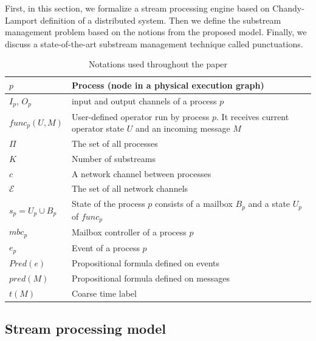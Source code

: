 \label{fs-acker-preliminaries}

First, in this section, we formalize a stream processing engine based on Chandy-Lamport definition of a distributed system. Then we define the substream management problem based on the notions from the proposed model. Finally, we discuss a state-of-the-art substream management technique called punctuations.

\begin{table}[!b]
    \caption{Notations used throughout the paper}
    \footnotesize
    \begin{tabular}{l|p{5cm}}
        \hline
        $p$ & Process (node in a physical execution graph) \\ 
        \hline
        $I_p$, $O_p$ & input and output channels of a process $p$ \\ 
        \hline
        $func_p(U, M)$ & User-defined operator run by process $p$. It receives current operator state $U$ and an incoming message $M$ \\ 
        \hline
        $\Pi$ & The set of all processes  \\
        \hline
        $K$ & Number of substreams  \\
        \hline
        $c$ & A network channel between processes  \\
        \hline
        $\mathcal{E}$ & The set of all network channels  \\
        \hline
        $s_p = U_p \cup B_p$ & State of the process $p$ consists of a mailbox $B_p$ and a state $U_p$ of $func_p$ \\
        \hline
        $mbc_{p}$ & Mailbox controller of a process $p$ \\
        \hline
        $e_{p}$ & Event of a process $p$ \\
        \hline
        $Pred(e)$ & Propositional formula defined on events \\
        \hline
        $pred(M)$ & Propositional formula defined on messages\\
        \hline
        $t(M)$ & Coarse time label \\
    \end{tabular}
    \label{notations}
\end{table}

\subsection{Stream processing model}
\label{fs-acker-processing-model}

